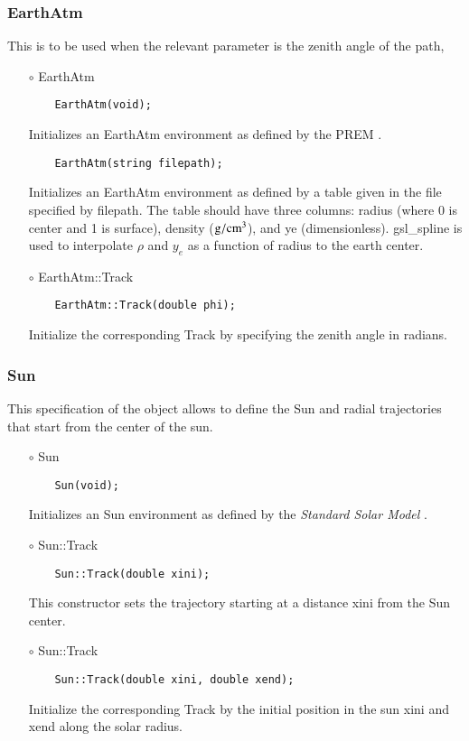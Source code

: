 \subsubsection{{EarthAtm}}
This is to be used when the relevant parameter is the zenith angle of
the path,
\begin{itemize}
\item[$\circ$] {\ttf EarthAtm}
  \begin{lstlisting}
    EarthAtm(void);
  \end{lstlisting}
  Initializes an {\ttf EarthAtm} environment as defined by the PREM \citep{dziewonski1981preliminary}.
  \begin{lstlisting}
    EarthAtm(string filepath);
  \end{lstlisting}
  Initializes an {\ttf EarthAtm} environment as defined by a table given in the file specified by {\ttf filepath}. The table should have three columns: radius (where 0 is center and 1 is surface), density (${\rm g}/{\rm cm}^3$), and ye (dimensionless). {\ttfamily gsl\_spline} \citep{gough2009gnu} is used to interpolate $\rho$ and $y_e$ as a function of radius to the earth center.
  \item[$\circ$] {\ttf EarthAtm::Track}
  \begin{lstlisting}
    EarthAtm::Track(double phi);
  \end{lstlisting}
  Initialize the corresponding {\ttf Track} by specifying the zenith angle in radians.
\end{itemize}

\subsubsection{{Sun}}
This specification of the object allows to define the Sun and radial
trajectories that start from the center of the sun.
\begin{itemize}
\item[$\circ$] {\ttf Sun}
  \begin{lstlisting}
    Sun(void);
  \end{lstlisting}
  Initializes an {\ttf Sun} environment as defined by the {\it Standard Solar Model} \citep{bahcall2005new}.
  \item[$\circ$] {\ttf Sun::Track}
  \begin{lstlisting}
    Sun::Track(double xini);
  \end{lstlisting}
  This constructor sets the trajectory starting at a distance 
  {\ttf xini} from the Sun center.
  \item[$\circ$] {\ttf Sun::Track}
  \begin{lstlisting}
    Sun::Track(double xini, double xend);
  \end{lstlisting}
  Initialize the corresponding {\ttf Track} by the initial position in the sun {\ttf xini} and {\ttf xend} along the solar radius.
\end{itemize}


